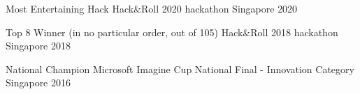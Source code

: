 



\begin{cvawards}

  \cvaward
    {Most Entertaining Hack} %
    {Hack\&Roll 2020 hackathon} %
    {Singapore} %
    {2020} %

  \cvaward
    {Top 8 Winner (in no particular order, out of 105)} %
    {Hack\&Roll 2018 hackathon} %
    {Singapore} %
    {2018} %

  \cvaward
    {National Champion} %
    {Microsoft Imagine Cup National Final - Innovation Category} %
    {Singapore} %
    {2016} %

\end{cvawards}
